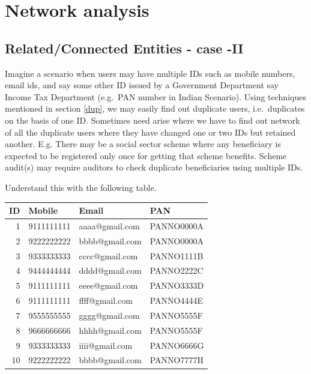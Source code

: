 \documentclass[
]{book}
\begin{document}
\hypertarget{dup_net}{%
\chapter{Network analysis}\label{dup_net}}

\hypertarget{relatedconnected-entities---case--ii}{%
\section{Related/Connected Entities - case -II}\label{relatedconnected-entities---case--ii}}

Imagine a scenario when users may have multiple IDs such as mobile numbers, email ids, and say some other ID issued by a Government Department say Income Tax Department (e.g.~PAN number in Indian Scenario). Using techniques mentioned in section \ref{dup}, we may easily find out duplicate users, i.e.~duplicates on the basis of one ID. Sometimes need arise where we have to find out network of all the duplicate users where they have changed one or two IDs but retained another. E.g. There may be a social sector scheme where any beneficiary is expected to be registered only once for getting that scheme benefits. Scheme audit(s) may require auditors to check duplicate beneficiaries using multiple IDs.

Understand this with the following table.

\begin{tabular}{r|l|l|l}
\hline
ID & Mobile & Email & PAN\\
\hline
1 & 9111111111 & aaaa@gmail.com & PANNO0000A\\
\hline
2 & 9222222222 & bbbb@gmail.com & PANNO0000A\\
\hline
3 & 9333333333 & cccc@gmail.com & PANNO1111B\\
\hline
4 & 9444444444 & dddd@gmail.com & PANNO2222C\\
\hline
5 & 9111111111 & eeee@gmail.com & PANNO3333D\\
\hline
6 & 9111111111 & ffff@gmail.com & PANNO4444E\\
\hline
7 & 9555555555 & gggg@gmail.com & PANNO5555F\\
\hline
8 & 9666666666 & hhhh@gmail.com & PANNO5555F\\
\hline
9 & 9333333333 & iiii@gmail.com & PANNO6666G\\
\hline
10 & 9222222222 & bbbb@gmail.com & PANNO7777H\\
\hline
\end{tabular}
\end{document}

